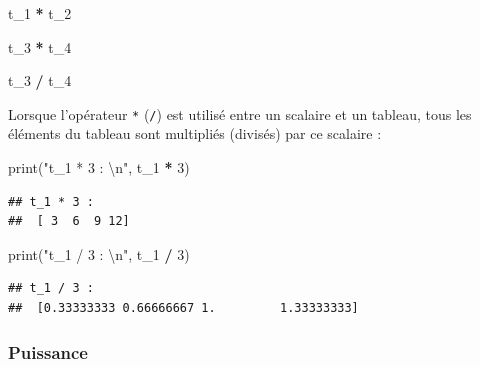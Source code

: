 \documentclass[12pt,]{book}
\newenvironment{Shaded}{\begin{snugshade}}{\end{snugshade}}
\newcommand{\DecValTok}[1]{\textcolor[rgb]{0.00,0.00,0.81}{#1}}
\newcommand{\CharTok}[1]{\textcolor[rgb]{0.31,0.60,0.02}{#1}}
\newcommand{\StringTok}[1]{\textcolor[rgb]{0.31,0.60,0.02}{#1}}
\newcommand{\OperatorTok}[1]{\textcolor[rgb]{0.81,0.36,0.00}{\textbf{#1}}}
\newcommand{\BuiltInTok}[1]{#1}
\newcommand{\NormalTok}[1]{#1}
\numberwithin{equation}{section}
\numberwithin{countremarque}{section}
\begin{document}
\begin{Shaded}
\begin{Highlighting}[]
\NormalTok{t_1 }\OperatorTok{*}\NormalTok{ t_2}
\end{Highlighting}
\end{Shaded}

\begin{Shaded}
\begin{Highlighting}[]
\NormalTok{t_3 }\OperatorTok{*}\NormalTok{ t_4}
\end{Highlighting}
\end{Shaded}

\begin{Shaded}
\begin{Highlighting}[]
\NormalTok{t_3 }\OperatorTok{/}\NormalTok{ t_4}
\end{Highlighting}
\end{Shaded}

Lorsque l'opérateur \texttt{*} (\texttt{/}) est utilisé entre un
scalaire et un tableau, tous les éléments du tableau sont multipliés
(divisés) par ce scalaire :

\begin{Shaded}
\begin{Highlighting}[]
\BuiltInTok{print}\NormalTok{(}\StringTok{"t_1 * 3 : }\CharTok{\textbackslash{}n}\StringTok{"}\NormalTok{, t_1 }\OperatorTok{*} \DecValTok{3}\NormalTok{)}
\end{Highlighting}
\end{Shaded}

\begin{lstlisting}
## t_1 * 3 : 
##  [ 3  6  9 12]
\end{lstlisting}

\begin{Shaded}
\begin{Highlighting}[]
\BuiltInTok{print}\NormalTok{(}\StringTok{"t_1 / 3 : }\CharTok{\textbackslash{}n}\StringTok{"}\NormalTok{, t_1 }\OperatorTok{/} \DecValTok{3}\NormalTok{)}
\end{Highlighting}
\end{Shaded}

\begin{lstlisting}
## t_1 / 3 : 
##  [0.33333333 0.66666667 1.         1.33333333]
\end{lstlisting}

\subsubsection{Puissance}\label{puissance-1}
\end{document}
